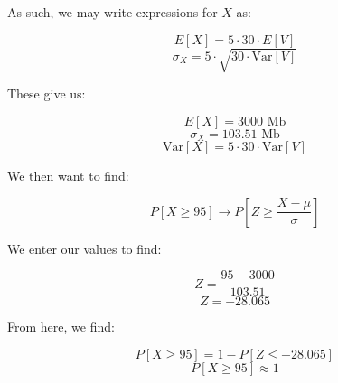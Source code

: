 \begin{enumerate}
    As such, we may write expressions for $X$ as:

    $$E[X]=5\cdot30\cdot E[V]$$
    $$\sigma_X=5\cdot\sqrt{30\cdot \text{Var}[V]}$$

    These give us:

    $$E[X]=3000\text{ Mb}$$
    $$\sigma_X=103.51\text{ Mb}$$
    $$\text{Var}[X]=5\cdot30\cdot \text{Var}[V]$$

    We then want to find:

    $$P\left[ X\geq95 \right]\to P\left[ Z\geq \frac{X-\mu}{\sigma}\right]$$

    We enter our values to find:

    $$Z=\frac{95-3000}{103.51}$$
    $$Z=-28.065$$

    From here, we find:

    $$P\left[ X\geq 95 \right]= 1-P[Z\leq -28.065]$$
    $$\boxed{P\left[ X\geq 95 \right]\approx 1}$$

\end{enumerate}



